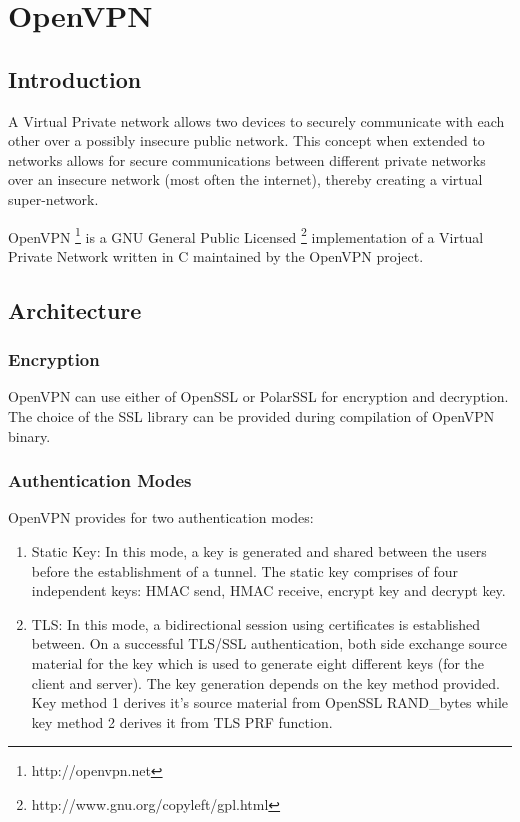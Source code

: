 \documentclass[11pt,oneside]{book}
\newcommand{\mychapter}[2]{
    \setcounter{chapter}{#1}
    \setcounter{section}{0}
    \chapter*{#2}
    \addcontentsline{toc}{chapter}{#2}
}
\begin{document}
\mainmatter

\mychapter{1}{OpenVPN}
\section{Introduction}
A Virtual Private network allows two devices to securely communicate with each other
over a possibly insecure public network. This concept when extended to networks
allows for secure communications between different private networks over an
insecure network (most often the internet), thereby creating a virtual super-network.

OpenVPN \footnote{http://openvpn.net} is a GNU General Public
Licensed \footnote{http://www.gnu.org/copyleft/gpl.html} implementation of a
Virtual Private Network written in C maintained by the OpenVPN project.

\section{Architecture}
\subsection{Encryption}
OpenVPN can use either of OpenSSL or PolarSSL for encryption and decryption. The choice of the SSL
library can be provided during compilation of OpenVPN binary.

\subsection{Authentication Modes}
OpenVPN provides for two authentication modes:

\begin{enumerate}
    \item {Static Key}: In this mode, a key is generated and shared between the users before
        the establishment of a tunnel. The static key comprises of four independent keys: HMAC send,
        HMAC receive, encrypt key and decrypt key.
    \item {TLS}: In this mode, a bidirectional session using certificates is established between.
        On a successful TLS/SSL authentication, both side exchange source material for the key
        which is used to generate eight different keys (for the client and server). The key
        generation depends on the key method provided. Key method 1 derives it's source material
        from OpenSSL RAND\_bytes while key method 2 derives it from TLS PRF function.
\end{enumerate}
\end{document}
